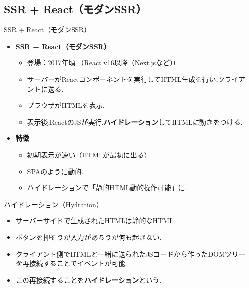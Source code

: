 \documentclass[aspectratio=169]{beamer}
\begin{document}
\subsection{SSR + React（モダンSSR）}
\begin{frame}{SSR + React（モダンSSR）}
    \begin{itemize}
        \setlength{\parskip}{1em}
        \item\textbf{SSR + React（モダンSSR）}
        \begin{itemize}
            \setlength{\parskip}{1em}
            \item 登場：2017年頃.（React v16以降（Next.jsなど））
            \item サーバーがReactコンポーネントを実行してHTML生成を行い,クライアントに送る.
            \item ブラウザがHTMLを表示.
            \item 表示後,ReactのJSが実行.\textbf{ハイドレーション}してHTMLに動きをつける.
        \end{itemize}
        \item\textbf{特徴}
        \begin{itemize}
            \setlength{\parskip}{1em}
            \item 初期表示が速い（HTMLが最初に出る）.
            \item SPAのように動的.
            \item ハイドレーションで「静的HTML\rightarrow 動的操作可能」に.
        \end{itemize}
    \end{itemize}
\end{frame}
\begin{frame}{ハイドレーション（Hydration）}
    \begin{itemize}
        \setlength{\parskip}{1em}
        \item サーバーサイドで生成されたHTMLは静的なHTML.
        \item ボタンを押そうが入力があろうが何も起きない.
        \item クライアント側でHTMLと一緒に送られたJSコードから作ったDOMツリーを再接続することでイベントが可能.
        \item この再接続することを\textbf{ハイドレーション}という.
    \end{itemize}
    
\end{frame}
\end{document}

